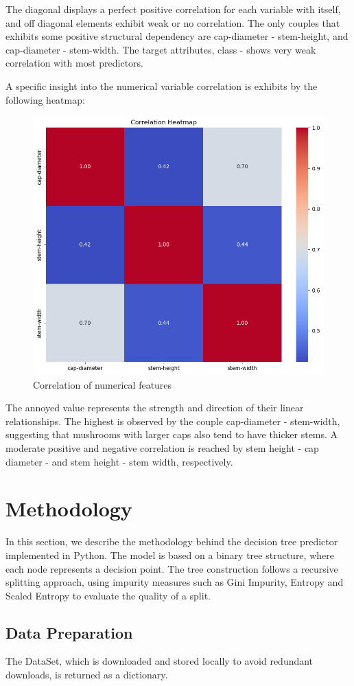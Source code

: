 \documentclass{article}
\begin{document}
The diagonal displays a perfect positive correlation for each variable with itself, and off diagonal elements exhibit weak or no correlation. The only couples that exhibits some positive structural dependency are cap-diameter - stem-height, and cap-diameter - stem-width. The target attributes, class - shows very weak correlation with most predictors.

A specific insight into the numerical variable correlation is exhibits by the following heatmap:

\begin{figure}[H]
\centering
\includegraphics[width=0.30\linewidth]{Correlation-Num.png}
\caption{\label{fig:frog}Correlation of numerical features}
\end{figure}


The annoyed value represents the strength and direction of their linear relationships. The highest is observed by the couple cap-diameter - stem-width, suggesting that mushrooms with larger caps also tend to have thicker stems. A moderate positive and negative correlation is reached by stem height - cap diameter - and stem height - stem width, respectively.

\section{Methodology}

In this section, we describe the methodology behind the decision tree predictor implemented in Python. The model is based on a binary tree structure, where each node represents a decision point. The tree construction follows a recursive splitting approach, using impurity measures such as Gini Impurity, Entropy and Scaled Entropy to evaluate the quality of a split.


\subsection{Data Preparation}

The DataSet, which is downloaded and stored locally to avoid redundant downloads, is returned as a dictionary. 
\end{document}
